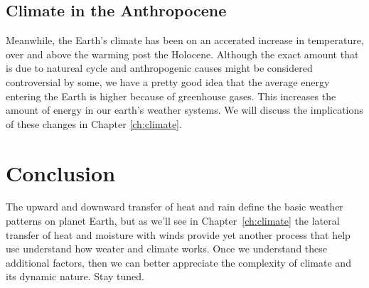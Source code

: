 \subsection{Climate in the Anthropocene}
 
Meanwhile, the Earth's climate has been on an accerated increase in temperature, over and above the warming post the Holocene. Although the exact amount that is due to natureal cycle and anthropogenic causes might be considered controversial by some, we have a pretty good idea that the average energy entering the Earth is higher because of greenhouse gases. This increases the amount of energy in our earth's weather systems. We will discuss the implications of these changes in Chapter \ref{ch:climate}. 

\section{Conclusion}

The upward and downward transfer of heat and rain define the basic weather patterns on planet Earth, but as we'll see in Chapter~\ref{ch:climate} the lateral transfer of heat and moisture with winds provide yet another process that help use understand how weater and climate works. Once we understand these additional factors, then we can better appreciate the complexity of climate and its dynamic nature.  Stay tuned.